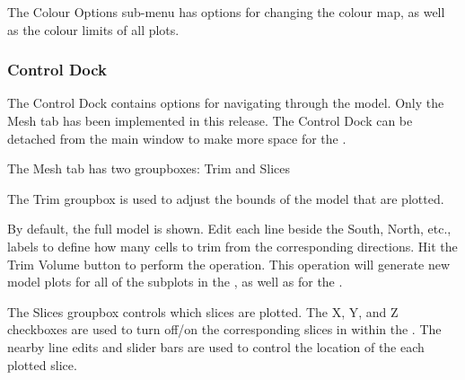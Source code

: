 \documentclass[letterpaper,10pt,english]{sphinxmanual}
\begin{document}
The Colour Options sub-menu has options for changing the colour map, as well as the colour limits of all plots.


\subsubsection{Control Dock}
\label{\detokenize{content/model_viewer/main_window:control-dock}}
\begin{figure}[htbp]
\centering

\noindent{}
\end{figure}

The Control Dock contains options for navigating through the model. Only the Mesh tab has been implemented in this release. The Control Dock can be detached from the main window to make more space for the {\hyperref[\detokenize{content/model_viewer/main_window:plot-window}]{}}.

The Mesh tab has two groupboxes: Trim and Slices

The Trim groupbox is used to adjust the bounds of the model that are plotted.

By default, the full model is shown. Edit each line beside the South, North, etc., labels to define how many cells to trim from the corresponding directions. Hit the Trim Volume button to perform the operation. This operation will generate new model plots for all of the subplots in the {\hyperref[\detokenize{content/model_viewer/main_window:id1}]{}}, as well as for the {\hyperref[\detokenize{content/model_viewer/main_window:d-view}]{}}.

The Slices groupbox controls which slices are plotted. The X, Y, and Z checkboxes are used to turn off/on the corresponding slices in within the {\hyperref[\detokenize{content/model_viewer/main_window:d-view}]{}}. The nearby line edits and slider bars are used to control the location of the each plotted slice.
\end{document}
